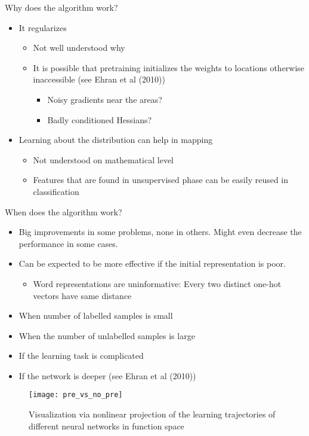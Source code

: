 \begin{frame}
Why does the algorithm work?
\begin{itemize}
\item It regularizes
\begin{itemize}
\item Not well understood why
\item It is possible that pretraining initializes the weights to locations otherwise inaccessible (see Ehran et al (2010))
\begin{itemize}
\item Noisy gradients near the areas?
\item Badly conditioned Hessians?
\end{itemize}
\end{itemize}
\item Learning about the distribution can help in mapping 
\begin{itemize}
\item Not understood on mathematical level
\item Features that are found in unsupervised phase can be easily reused in classification
\end{itemize}
\end{itemize}
\end{frame}

\begin{frame}
When does the algorithm work?
\begin{itemize}
\item Big improvements in some problems, none in others. Might even decrease the performance in some cases.
\item Can be expected to be more effective if the initial representation is poor.
\begin{itemize}
\item Word representations are uninformative: Every two distinct one-hot vectors have same distance 
\end{itemize}
\item When number of labelled samples is small
\item When the number of unlabelled samples is large
\item If the learning task is complicated
\item If the network is deeper (see Ehran et al (2010))
\end{itemize}
\end{frame}


\begin{frame}
\begin{figure}[t]
\centering
\texttt{[image: pre\_vs\_no\_pre]} %
\caption{Visualization via nonlinear projection of the learning trajectories of different
neural networks in function space}
\end{figure}
\end{frame}


